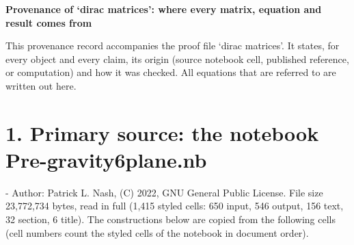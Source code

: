 \documentclass[10pt]{article}
\makeatletter
\newcommand\keepnext{\par\nopagebreak\@nobreaktrue\everypar{\@nobreakfalse\everypar{}}}
\newcommand\mdneed[1]{\par\if@nobreak\else\begingroup\setlength{\dimen@}{#1}\dimen@ii\pagegoal\advance\dimen@ii-\pagetotal
  \ifdim\dimen@>\dimen@ii\ifdim\dimen@ii>\z@\vfil\fi\break\fi\endgroup\fi}
\makeatother
\begin{document}
{\raggedright\LARGE\bfseries Provenance of `dirac matrices': where every matrix, equation and result comes from\par}\medskip

This provenance record accompanies the proof file `dirac matrices'. It states, for every object and every claim, its origin (source notebook cell, published reference, or computation) and how it was checked. All equations that are referred to are written out here.


\section*{1. Primary source: the notebook Pre-gravity6plane.nb}

\mdneed{9.4\baselineskip}Author: Patrick L. Nash, (C) 2022, GNU General Public License. File size 23,772,734 bytes, read in full (1,415 styled cells: 650 input, 546 output, 156 text, 32 section, 6 title). The constructions below are copied from the following cells (cell numbers count the styled cells of the notebook in document order).\keepnext
\end{document}
